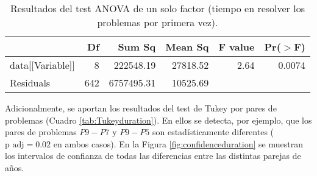 \begin{table}[H]
\centering
\caption{Resultados del test ANOVA de un solo factor (tiempo en resolver los problemas por primera vez).}
\label{tab:ANOVAduration}
\begin{tabular}{lrrrrr}
  \hline
 & Df & Sum Sq & Mean Sq & F value & Pr($>$F) \\ 
  \hline
data[[Variable]] & 8 & 222548.19 & 27818.52 & 2.64 & 0.0074 \\ 
  Residuals           & 642 & 6757495.31 & 10525.69 &  &  \\ 
   \hline
\end{tabular}
\end{table}

Adicionalmente, se aportan los resultados del test de Tukey por pares de problemas (Cuadro \ref{tab:Tukeyduration}). En ellos se detecta, por ejemplo, que los pares de problemas $P9-P7$ y $P9-P5$ son estadísticamente diferentes ($\text{p adj} = 0.02$ en ambos casos). En la Figura \ref{fig:confidenceduration} se muestran los intervalos de confianza de todas las diferencias entre las distintas parejas de años.

